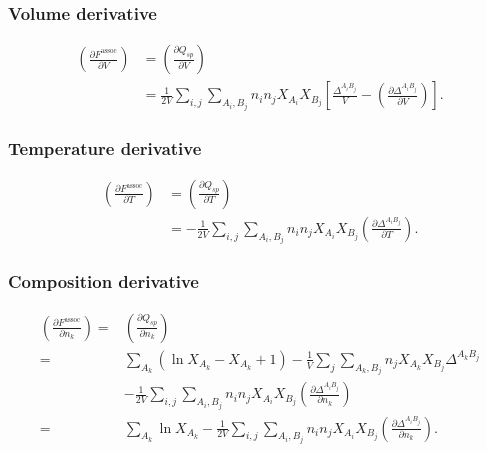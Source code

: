 \documentclass[english]{../thermomemo/thermomemo}
\newcommand*{\pder}[2]{\left(\frac{\partial #1}{\partial #2}\right)}
\newcommand{\lp}{\left(}
\newcommand{\rp}{\right)}
\begin{document}
\subsubsection{Volume derivative}
\begin{align}
  \pder{F^{\text{assoc}}}{V} &= \pder{Q_{sp}}{V} \\ \nonumber
  &= \frac{1}{2V} \sum_{i,j} \sum_{A_i, B_j} n_i n_j X_{A_i} X_{B_j} \left[ \frac{\Delta^{A_i B_j}}{V} - \pder{\Delta^{A_i B_j}}{V} \right].
\end{align}

\subsubsection{Temperature derivative}
\begin{align}
  \pder{F^{\text{assoc}}}{T} &= \pder{Q_{sp}}{T} \\ \nonumber
  &= -\frac{1}{2V} \sum_{i,j} \sum_{A_i, B_j} n_i n_j X_{A_i} X_{B_j} \pder{\Delta^{A_i B_j}}{T}.
\end{align}

\subsubsection{Composition derivative}
\begin{align}
  \pder{F^{\text{assoc}}}{n_k} =& \pder{Q_{sp}}{n_k} \nonumber \\ 
  =& \sum_{A_k} \lp \ln X_{A_k} - X_{A_k} + 1\rp - \frac{1}{V} \sum_{j} \sum_{A_k,B_j} n_j X_{A_k} X_{B_j} \Delta^{A_k B_j} \label{l1}\\
  &- \frac{1}{2V} \sum_{i,j} \sum_{A_i, B_j} n_i n_j X_{A_i} X_{B_j} \pder{\Delta^{A_i B_j}}{n_k} \label{l2}\\
  =& \sum_{A_k} \ln X_{A_k} - \frac{1}{2V} \sum_{i,j} \sum_{A_i, B_j} n_i n_j X_{A_i} X_{B_j} \pder{\Delta^{A_i B_j}}{n_k}. \label{nono}
\end{align}
\end{document}
